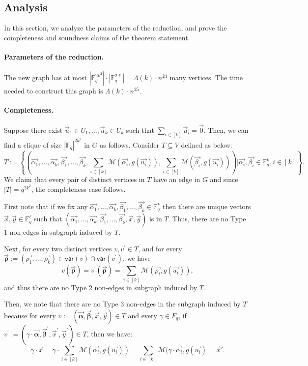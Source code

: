 \documentclass[10pt,a4paper]{article}
\newcommand{\F}{\mathbb{F}}
\newcommand{\alphab}{\vec{\bm{\alpha}}}
\newcommand{\betab}{\vec{\bm{\beta}}}
\newcommand{\var}{\mathsf{var}}
\newcommand{\M}{\mathcal{M}}
\begin{document}
\subsection{Analysis}\label{sec:analysis}
In this section, we analyze the parameters of the reduction, and prove the completeness and soundness claims of the theorem statement. 


\paragraph{Parameters of the reduction.} 
The new graph has at most  $|\F_q^{2k^2}|\cdot |\F_q^{2\ell}|=\Lambda(k)\cdot n^{24}$ many vertices. The time needed to construct this graph is $\Lambda(k)\cdot n^{25}$.  

\paragraph{Completeness.} Suppose there exist $\vec{u}_1\in U_1,\ldots,\vec{u}_k\in U_k$ such that
$
\sum_{i\in[k]}\vec{u}_i=\vec{0}
$. Then, we can find a clique of size $|\F_q|^{2k^2}$ in $G$ as follows. Consider $T\subseteq V$ defined as below:
$$
T:=\left\{\left(\vec{\alpha_1},\ldots ,\vec{\alpha_{k}},\vec{\beta_1},\ldots ,\vec{\beta_{k}},\sum_{i\in[k]}\M(\vec{\alpha_i},g(\vec{u_i})),\sum_{i\in[k]}\M(\vec{\beta_i},g(\vec{u_i}))\right)\bigg| \vec{\alpha_i},\vec{\beta_i}\in\F_q^k, i\in[k]\right\}.
$$ 
We claim that every pair of distinct vertices in $T$ have an edge in $G$ and since $|T|=q^{2k^2}$, the completeness case follows.  

First note that if we fix any $\vec{\alpha_1},\ldots ,\vec{\alpha_{k}},\vec{\beta_1},\ldots ,\vec{\beta_{k}}\in \F_q^k$ then there are unique vectors $\vec{x},\vec{y}\in\F_q^\ell$ such that  $\left(\vec{\alpha_1},\ldots ,\vec{\alpha_{k}},\vec{\beta_1},\ldots ,\vec{\beta_{k}},\vec{x},\vec{y}\right)$ is in $T$. Thus, there are no Type 1 non-edges in subgraph induced by $T$.

Next, for every two distinct vertices $v,v^{\prime}\in T$, and for every $\vec{\bm{\rho}}:=(\vec{\rho_1},\ldots ,\vec{\rho_{k}})\in \var(v)\cap\var(v^{\prime})$, we have  $$
v(\vec{\bm{\rho}})=v^{\prime}(\vec{\bm{\rho}})=\sum_{i\in[k]} \M(\vec{\rho_i},g(\vec{u_i})), 
$$
and thus there are no Type 2 non-edges in subgraph induced by $T$.

Then,  we note that there are no Type 3 non-edges in the subgraph induced by $T$ because for every $v:=(\alphab,\betab,\vec{x},\vec{y})\in T$ and every $\gamma\in F_q$, if $v^\prime:=(\gamma\cdot \alphab,\betab^\prime,\vec{x}^\prime,\vec{y}^\prime)\in T$, then we have:
$$
\gamma\cdot \vec{x}=\gamma \cdot \sum_{i\in[k]}\M(\vec{\alpha_i},g(\vec{u_i})) = \sum_{i\in[k]}\M(\gamma \cdot \vec{\alpha_i},g(\vec{u_i})=\vec{x}'.
$$
\end{document}
